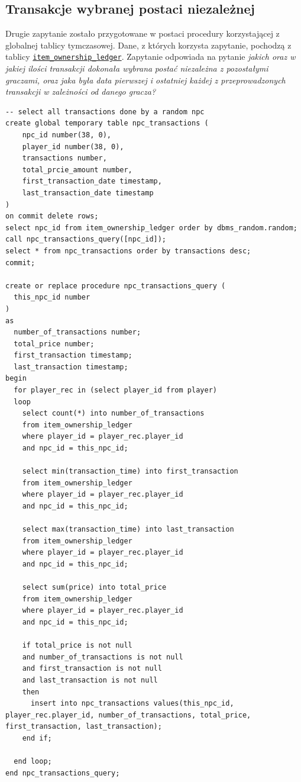 \documentclass[11pt]{article}
\begin{document}
\subsection{Transakcje wybranej postaci niezależnej}
\label{sec:org134c64a}
Drugie zapytanie zostało przygotowane w postaci procedury korzystającej z globalnej
tablicy tymczasowej. Dane, z których korzysta zapytanie, pochodzą z tablicy \hyperref[sec:org340c0bf]{\texttt{item\_ownership\_ledger}}.
Zapytanie odpowiada na pytanie \emph{jakich oraz w jakiej ilości transakcji dokonała wybrana}
\emph{postać niezależna z pozostałymi graczami, oraz jaka była data pierwszej i ostatniej każdej z
przeprowadzonych transakcji w zależności od danego gracza?}
\begin{verbatim}
-- select all transactions done by a random npc
create global temporary table npc_transactions (
    npc_id number(38, 0),
    player_id number(38, 0),
    transactions number,
    total_prcie_amount number,
    first_transaction_date timestamp,
    last_transaction_date timestamp
)
on commit delete rows;
select npc_id from item_ownership_ledger order by dbms_random.random;
call npc_transactions_query([npc_id]);
select * from npc_transactions order by transactions desc;
commit;

create or replace procedure npc_transactions_query (
  this_npc_id number
)
as
  number_of_transactions number;
  total_price number;
  first_transaction timestamp;
  last_transaction timestamp;
begin
  for player_rec in (select player_id from player)
  loop
    select count(*) into number_of_transactions
    from item_ownership_ledger
    where player_id = player_rec.player_id
    and npc_id = this_npc_id;

    select min(transaction_time) into first_transaction
    from item_ownership_ledger
    where player_id = player_rec.player_id
    and npc_id = this_npc_id;

    select max(transaction_time) into last_transaction
    from item_ownership_ledger
    where player_id = player_rec.player_id
    and npc_id = this_npc_id;

    select sum(price) into total_price
    from item_ownership_ledger
    where player_id = player_rec.player_id
    and npc_id = this_npc_id;

    if total_price is not null
    and number_of_transactions is not null
    and first_transaction is not null
    and last_transaction is not null
    then
      insert into npc_transactions values(this_npc_id, player_rec.player_id, number_of_transactions, total_price, first_transaction, last_transaction);
    end if;

  end loop;
end npc_transactions_query;
\end{verbatim}
\end{document}
